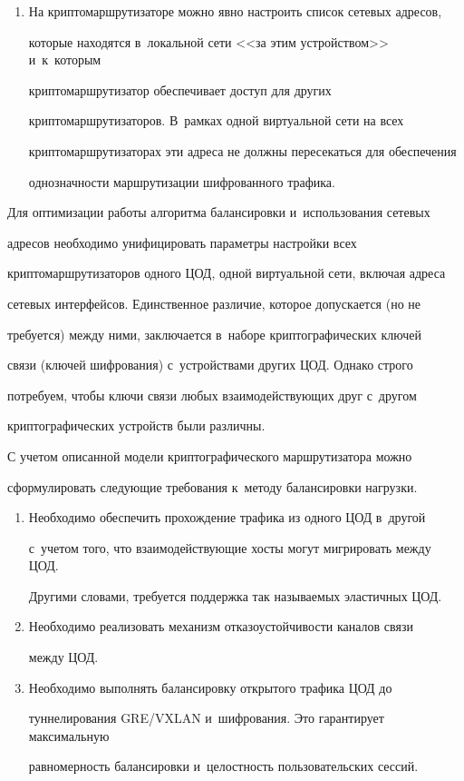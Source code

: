 \begin{enumerate}[1.]
отправляется получателю, если нет~--- отбрасывается.


\item На криптомаршрутизаторе можно явно настроить список сетевых адресов, 


которые находятся в~локальной сети <<за этим устройством>> и~к~которым 


крип\-то\-марш\-ру\-ти\-за\-тор обеспечивает доступ для других 


крип\-то\-марш\-ру\-ти\-за\-то\-ров. В~рамках одной виртуальной сети на всех 


криптомаршрутизаторах эти адреса не должны пересекаться для обеспечения 


однозначности маршрутизации шифрованного трафика.


  \end{enumerate}


  Для оптимизации работы алгоритма балансировки и~использования сетевых 


адресов необходимо унифицировать параметры настройки всех 


криптомаршрутизаторов одного ЦОД, одной виртуальной сети, включая адреса 


сетевых интерфейсов. Единственное различие, которое допускается (но не 


требуется) между ними, заключается в~наборе криптографических ключей 


связи (ключей шифрования) с~устройствами других ЦОД. Однако строго 


потребуем, чтобы ключи связи любых взаимодействующих друг с~другом 


криптографических устройств были различны.


  


  С учетом описанной модели криптографического маршрутизатора можно 


сформулировать следующие требования к~методу балансировки нагрузки.


  \begin{enumerate}[1.]


\item Необходимо обеспечить прохождение трафика из одного ЦОД в~другой 


с~учетом того, что взаимодействующие хосты могут мигрировать между ЦОД. 


Другими словами, требуется поддержка так называемых эластичных ЦОД.


\item Необходимо реализовать механизм отказоустойчивости каналов связи 


между ЦОД.


\item Необходимо выполнять балансировку открытого трафика ЦОД до 


туннелирования GRE\!/\!VXLAN и~шифрования. Это гарантирует максимальную 


равномерность балансировки и~целостность пользовательских сессий.


\end{enumerate}





